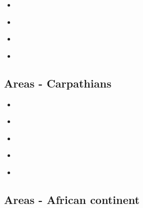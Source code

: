 \begin{scriptsize}
\begin{itemize}
\item[\twothousandseven]
\textcite{buto07b} \\
\item[\twothousandthirteen]
\textcite{gahs13} \\
\item[\twothousandfourteen]
\textcite{gahs14} \\
\item[\twothousandfifteen]
\textcite{rotv15} \\
\end{itemize}
\end{scriptsize}

\subsection{Areas - Carpathians}

\begin{scriptsize}
\begin{itemize}
\item[\twothousand]
\textcite{wosp00} \\
\item[\twothousandfour]
\textcite{clbm04} \\
\item[\twothousandfive]
\textcite{isms05} \\
\item[\twothousandsix]
\textcite{nehe06} \\
\item[\twothousandnineteen]
\textcite{sepg19} \\
\end{itemize}
\end{scriptsize}

\subsection{Areas - African continent}

